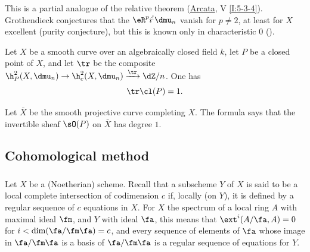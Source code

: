 This is a partial analogue of the relative theorem
(\hyperref[I]{Arcata}, V \ref{I:5-3-4}). Grothendieck conjectures
that the $\eR^p i^! \dmu_n$ vanish for $p\ne 2$, at least for $X$ excellent
(purity conjecture), but this is known only in characteristic $0$
().






\begin{theorem}\label{IV:2-1-5}
Let $X$ be a smooth curve over an algebraically closed field $k$, let $P$ be a
closed point of $X$, and let $\tr$ be the composite
$\h_P^2(X,\dmu_n) \to \h_c^2(X,\dmu_n) \xrightarrow{\tr} \dZ/n$. One has
\[
  \tr \cl(P) = 1 \text{.}
\]
\end{theorem}

Let $\bar X$ be the smooth projective curve completing $X$. The formula says
that the invertible sheaf $\sO(P)$ on $\bar X$ has degree $1$.











\subsection{Cohomological method}\label{IV:2-2}






\subsubsection{}\label{IV:2-2-1}

Let $X$ be a (Noetherian) scheme. Recall that a subscheme $Y$ of $X$ is said
to be a local complete intersection of codimension $c$ if, locally (on $Y$),
it is defined by a regular sequence of $c$ equations in $X$. For $X$ the
spectrum of a local ring $A$ with maximal ideal $\fm$, and $Y$ with ideal
$\fa$, this means that $\ext^i(A/\fa,A) = 0$ for
$i<\dim(\fa/\fm\fa)=c$, and every sequence of elements of $\fa$ whose image
in $\fa/\fm\fa$ is a basis of $\fa/\fm\fa$ is a regular sequence of
equations for $Y$.






\subsubsection{}\label{IV:2-2-2}

